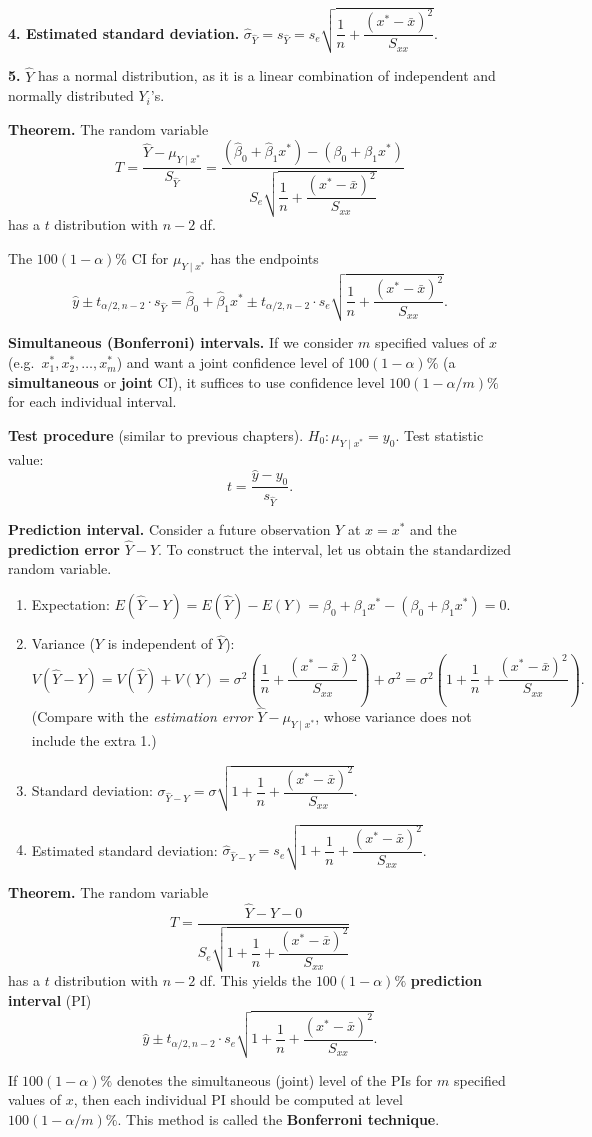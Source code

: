 \textbf{4. Estimated standard deviation.} $\hat\sigma_{\hat{Y}}=s_{\hat{Y}}=s_e\sqrt{\dfrac{1}{n}+\dfrac{(x^*-\bar{x})^2}{S_{xx}}}$.

\textbf{5.} $\hat{Y}$ has a normal distribution, as it is a linear combination of independent and normally distributed $Y_i$'s.

\textbf{Theorem.} The random variable
\[
T=\frac{\hat{Y}-\mu_{Y\mid x^*}}{S_{\hat{Y}}}=\frac{(\hat\beta_0+\hat\beta_1x^*)-(\beta_0+\beta_1x^*)}{S_e\sqrt{\dfrac{1}{n}+\dfrac{(x^*-\bar{x})^2}{S_{xx}}}}
\]
has a $t$ distribution with $n-2$ df.

The $100(1-\alpha)\%$ CI for $\mu_{Y\mid x^*}$ has the endpoints
\[
\hat{y}\pm t_{\alpha/2,n-2}\cdot s_{\hat{Y}}=\hat\beta_0+\hat\beta_1x^*\pm t_{\alpha/2,n-2}\cdot s_e\sqrt{\frac{1}{n}+\frac{(x^*-\bar{x})^2}{S_{xx}}}.
\]

\textbf{Simultaneous (Bonferroni) intervals.} If we consider $m$ specified values of $x$ (e.g.\ $x_1^*,x_2^*,\dots,x_m^*$) and want a joint confidence level of $100(1-\alpha)\%$ (a \textbf{simultaneous} or \textbf{joint} CI),
it suffices to use confidence level $100(1-\alpha/m)\%$ for each individual interval.

\textbf{Test procedure} (similar to previous chapters). $H_0:\mu_{Y\mid x^*}=y_0$. Test statistic value:
\[
t=\frac{\hat{y}-y_0}{s_{\hat{Y}}}.
\]

\textbf{Prediction interval.} Consider a future observation $Y$ at $x=x^*$ and the \textbf{prediction error} $\hat{Y}-Y$.
To construct the interval, let us obtain the standardized random variable.
\begin{enumerate}
  \item Expectation: $E(\hat{Y}-Y)=E(\hat{Y})-E(Y)=\beta_0+\beta_1x^*-(\beta_0+\beta_1x^*)=0$.
  \item Variance ($Y$ is independent of $\hat{Y}$):
  \[
  V(\hat{Y}-Y)=V(\hat{Y})+V(Y)=\sigma^2\left(\frac{1}{n}+\frac{(x^*-\bar{x})^2}{S_{xx}}\right)+\sigma^2=\sigma^2\left(1+\frac{1}{n}+\frac{(x^*-\bar{x})^2}{S_{xx}}\right).
  \]
  (Compare with the \emph{estimation error} $\hat{Y}-\mu_{Y\mid x^*}$, whose variance does not include the extra 1.)
  \item Standard deviation: $\sigma_{\hat{Y}-Y}=\sigma\sqrt{1+\dfrac{1}{n}+\dfrac{(x^*-\bar{x})^2}{S_{xx}}}$.
  \item Estimated standard deviation: $\hat\sigma_{\hat{Y}-Y}=s_e\sqrt{1+\dfrac{1}{n}+\dfrac{(x^*-\bar{x})^2}{S_{xx}}}$.
\end{enumerate}

\textbf{Theorem.} The random variable
\[
T=\frac{\hat{Y}-Y-0}{S_e\sqrt{1+\dfrac{1}{n}+\dfrac{(x^*-\bar{x})^2}{S_{xx}}}}
\]
has a $t$ distribution with $n-2$ df. This yields the $100(1-\alpha)\%$ \textbf{prediction interval} (PI)
\[
\hat{y}\pm t_{\alpha/2,n-2}\cdot s_e\sqrt{1+\frac{1}{n}+\frac{(x^*-\bar{x})^2}{S_{xx}}}.
\]

If $100(1-\alpha)\%$ denotes the simultaneous (joint) level of the PIs for $m$ specified values of $x$, then each individual PI should be computed at level $100(1-\alpha/m)\%$.
This method is called the \textbf{Bonferroni technique}.
